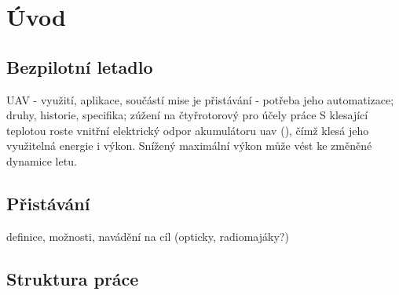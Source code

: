 \chapter{Úvod} \label{chap:introduction}




\section{Bezpilotní letadlo}
UAV - využití, aplikace, součástí mise je přistávání - potřeba jeho automatizace; druhy, historie, specifika; zúžení na čtyřrotorový pro účely práce
S klesající teplotou roste vnitřní elektrický odpor akumulátoru \acrshort{uav} (\cite{lipo}), čímž klesá jeho využitelná energie i výkon. Snížený maximální výkon může vést ke změněné dynamice letu.
\section{Přistávání}
definice, možnosti, navádění na cíl (opticky, radiomajáky?)
\section{Struktura práce}